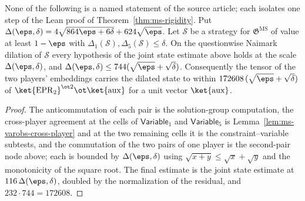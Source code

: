 \begin{lemma}\label{lem:ms-rigidity-support-assembly}
	\leanok
	None of the following is a named statement of the source article; each isolates one step of the Lean proof of Theorem~\ref{thm:ms-rigidity}. Put $\Delta(\eps, \delta) = 4\sqrt{864\eps + 6\delta} + 624\sqrt\eps$. Let $\mathcal S$ be a strategy for $\mathfrak{G}^{\mathrm{MS}}$ of value at least $1 - \eps$ with $\Delta_1(\mathcal S), \Delta_5(\mathcal S) \le \delta$. On the questionwise Naimark dilation of $\mathcal S$ every hypothesis of the joint state estimate above holds at the scale $\Delta(\eps, \delta)$, and $\Delta(\eps, \delta) \le 744(\sqrt\eps + \sqrt\delta)$. Consequently the tensor of the two players' embeddings carries the dilated state to within $172608\,(\sqrt\eps + \sqrt\delta)$ of $\ket{\mathrm{EPR}_2}^{\ot 2} \ot \ket{\mathrm{aux}}$ for a unit vector $\ket{\mathrm{aux}}$.
\end{lemma}
\begin{proof}
	\leanok
	The anticommutation of each pair is the solution-group computation, the cross-player agreement at the cells of $\mathsf{Variable}_1$ and $\mathsf{Variable}_5$ is Lemma~\ref{lem:ms-varobs-cross-player} and at the two remaining cells it is the constraint--variable subtests, and the commutation of the two pairs of one player is the second-pair node above; each is bounded by $\Delta(\eps, \delta)$ using $\sqrt{x + y} \le \sqrt x + \sqrt y$ and the monotonicity of the square root. The final estimate is the joint state estimate at $116\,\Delta(\eps, \delta)$, doubled by the normalization of the residual, and $232 \cdot 744 = 172608$.
\end{proof}

